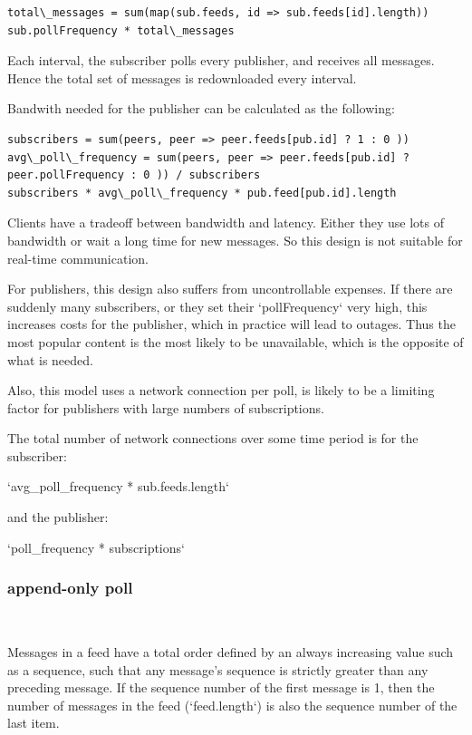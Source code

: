 \documentclass[sigconf]{acmart}
\begin{document}
\begin{verbatim}
total\_messages = sum(map(sub.feeds, id => sub.feeds[id].length))
sub.pollFrequency * total\_messages
\end{verbatim}
Each interval, the subscriber polls every publisher, and receives all
messages.  Hence the total set of messages is redownloaded every
interval.

Bandwith needed for the publisher can be calculated as the following:

\begin{verbatim}
subscribers = sum(peers, peer => peer.feeds[pub.id] ? 1 : 0 ))
avg\_poll\_frequency = sum(peers, peer => peer.feeds[pub.id] ? peer.pollFrequency : 0 )) / subscribers
subscribers * avg\_poll\_frequency * pub.feed[pub.id].length
\end{verbatim}

Clients have a tradeoff between bandwidth and latency. Either they use
lots of bandwidth or wait a long time for new messages. So this design
is not suitable for real-time communication.

For publishers, this design also suffers from uncontrollable
expenses. If there are suddenly many subscribers, or they set their
`pollFrequency` very high, this increases costs for the publisher,
which in practice will lead to outages. Thus the most popular content
is the most likely to be unavailable, which is the opposite of what is
needed.

Also, this model uses a network connection per poll, is likely to be a
limiting factor for publishers with large numbers of subscriptions.

The total number of network connections over some time period is for
the subscriber:

`avg\_poll\_frequency * sub.feeds.length`

and the publisher:

`poll\_frequency * subscriptions`

\subsubsection{append-only poll}\ \\ \vspace{-1em}

Messages in a feed have a total order defined by an always increasing
value such as a sequence, such that any message's sequence is strictly
greater than any preceding message. If the sequence number of the
first message is 1, then the number of messages in the feed
(`feed.length`) is also the sequence number of the last item.
\end{document}
